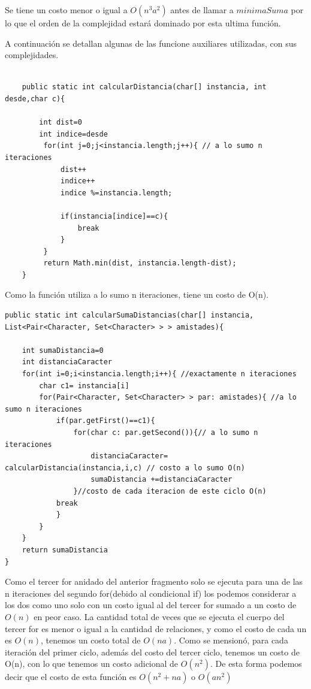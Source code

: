 Se tiene un costo menor o igual a $ O(n^{3}a^{2}) $ antes de llamar a $ minimaSuma $ por lo que el orden de la complejidad estará dominado por esta ultima función.

A continuación se detallan algunas de las funcione auxiliares utilizadas, con sus complejidades. 

\begin{lstlisting}

	public static int calcularDistancia(char[] instancia, int desde,char c){
		
		int dist=0
		int indice=desde
		 for(int j=0;j<instancia.length;j++){ // a lo sumo n iteraciones	 
			 dist++ 
			 indice++ 
			 indice %=instancia.length;
			 
			 if(instancia[indice]==c){
				 break
			 }	 
		 } 
		 return Math.min(dist, instancia.length-dist);
	}

\end{lstlisting}

Como la función utiliza a lo sumo n iteraciones, tiene un costo de O(n).


\begin{lstlisting}
public static int calcularSumaDistancias(char[] instancia, List<Pair<Character, Set<Character> > > amistades){
		
	int sumaDistancia=0
	int distanciaCaracter
	for(int i=0;i<instancia.length;i++){ //exactamente n iteraciones
		char c1= instancia[i]
		for(Pair<Character, Set<Character> > par: amistades){ //a lo sumo n iteraciones
			if(par.getFirst()==c1){
				for(char c: par.getSecond()){// a lo sumo n iteraciones
					distanciaCaracter= calcularDistancia(instancia,i,c) // costo a lo sumo O(n)
					sumaDistancia +=distanciaCaracter					
				}//costo de cada iteracion de este ciclo O(n)
			break	
			}				
		}
	}
	return sumaDistancia
}
\end{lstlisting}

Como el tercer for anidado del anterior fragmento solo se ejecuta para una de las n iteraciones del segundo for(debido al condicional if) los podemos considerar a los dos como uno solo con un costo igual al del tercer for sumado a un costo de $O(n)$ en peor caso. La cantidad total de veces que se ejecuta el cuerpo del tercer for es menor o igual a la cantidad de relaciones, y como el costo de cada un es $O(n)$, tenemos un costo total de $O(na)$. Como se mensionó, para cada iteración del primer ciclo, además del costo del tercer ciclo, tenemos un costo de O(n), con lo que tenemos un costo adicional de $O(n^2)$. De esta forma podemos decir que el costo de esta función es $O(n^2+na)$ o $O(an^2)$



